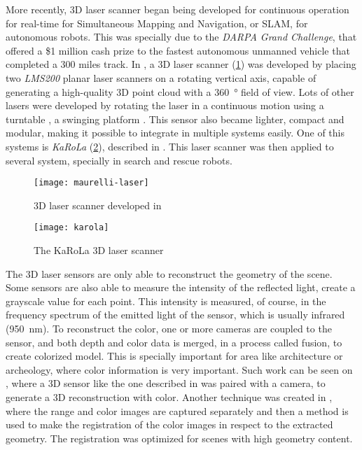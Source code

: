 More recently, 3D laser scanner began being developed for continuous operation for real-time for Simultaneous Mapping and Navigation, or SLAM, for autonomous robots. This was specially due to the \textit{DARPA Grand Challenge}, that offered a \$1 million cash prize to the fastest autonomous unmanned vehicle that completed a 300 miles track. In \cite{maurelli2009}, a 3D laser scanner (\cref{fig:maurelli-laser-scanner}) was developed by placing two \textit{LMS200} planar laser scanners on a rotating vertical axis, capable of generating a high-quality 3D point cloud with a \SI{360}{\degree} field of view. Lots of other lasers were developed by rotating the laser in a continuous motion using a turntable \cite{nemoto2007}, a swinging platform \cite{yoshida11}. This sensor also became lighter, compact and modular, making it possible to integrate in multiple systems easily. One of this systems is \textit{KaRoLa} (\cref{fig:karola}), described in \cite{karola14}. This laser scanner was then applied to several system, specially in search and rescue robots.

\begin{figure}[h]
    \centering
    \texttt{[image: maurelli-laser]}
    \caption{3D laser scanner developed in \cite{maurelli2009}}
    \label{fig:maurelli-laser-scanner}
\end{figure}

\begin{figure}[h]
    \centering
    \texttt{[image: karola]}
    \caption{The KaRoLa 3D laser scanner}
    \label{fig:karola}
\end{figure}

The 3D laser sensors are only able to reconstruct the geometry of the scene. Some sensors are also able to measure the intensity of the reflected light, create a grayscale value for each point. This intensity is measured, of course, in the frequency spectrum of the emitted light of the sensor, which is usually infrared (\SI{950}{\nano\meter}). To reconstruct the color, one or more cameras are coupled to the sensor, and both depth and color data is merged, in a process called fusion, to create colorized model. This is specially important for area like architecture or archeology, where color information is very important. Such work can be seen on \cite{pdias2006}, where a 3D sensor like the one described in \cite{surmann2003} was paired with a camera, to generate a 3D reconstruction with color. Another technique was created in \cite{stamus2000}, where the range and color images are captured separately and then a method is used to make the registration of the color images in respect to the extracted geometry. The registration was optimized for scenes with high geometry content.

